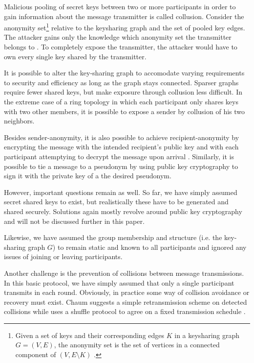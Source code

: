 Malicious pooling of secret keys between two or more participants in order to
gain information about the message transmitter is called collusion.
Consider the anonymity set\footnote{Given a set of keys and their corresponding edges $K$ in a keysharing graph $G = (V, E)$, the anonymity set is the set of vertices in a connected component of $(V, E \setminus K)$ \cite{journals/joc/Chaum88}.}
relative to the keysharing graph and the set of pooled key edges.
The attacker gains only the knowledge which anonymity set the transmitter belongs to \cite{journals/joc/Chaum88}. To completely expose the transmitter, the attacker would
have to own every single key shared by the transmitter.

It is possible to alter the key-sharing graph to accomodate varying requirements to
security and efficiency as long as the graph stays connected. Sparser graphs require fewer
shared keys, but make exposure through collusion less difficult. In the extreme case of
a ring topology in which each participant only shares keys with two other members, it is
possible to expose a sender by collusion of his two neighbors.

Besides sender-anonymity, it is also possible to achieve recipient-anonymity by
encrypting the message with the intended recipient's public key and with each
participant attemptying to decrypt the message upon arrival \cite{journals/joc/Chaum88}.
Similarly, it is possible to tie a message to a pseudonym by using public key cryptography
to sign it with the private key of a the desired pseudonym.

However, important questions remain as well. So far, we have simply assumed secret shared keys
to exist, but realistically these have to be generated and shared securely. Solutions
again mostly revolve around public key cryptography and will not be discussed further in
this paper.

Likewise, we have assumed the group membership and structure (i.e. the key-sharing graph $G$)
to remain static and known to all participants and ignored any issues of joining or leaving participants.

Another challenge is the prevention of collisions between message transmissions.
In this basic protocol, we have simply assumed that only a single participant transmits
in each round. Obviously, in practice some way of collision avoidance or recovery must exist.
Chaum suggests a simple retransmission scheme on detected collisions \cite{journals/joc/Chaum88}
while \Dissent uses a shuffle protocol to agree on
a fixed transmission schedule \cite{journals/corr/abs-1004-3057}.

